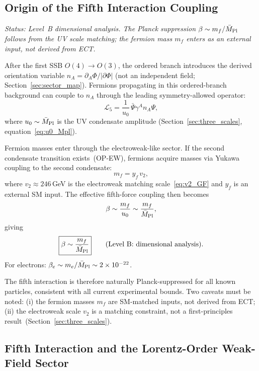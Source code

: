 \documentclass[11pt,a4paper]{article}
\numberwithin{equation}{section}
\begin{document}
\subsection{Origin of the Fifth Interaction Coupling}

\textit{Status: Level~B dimensional analysis. The Planck suppression
$\beta\sim m_f/\bar{M}_{\rm Pl}$ follows from the UV scale matching;
the fermion mass $m_f$ enters as an external input, not derived from ECT.}

After the first SSB $O(4)\to O(3)$, the ordered branch introduces
the derived orientation variable $n_A=\partial_A\Phi/|\partial\Phi|$
(not an independent field; Section~\ref{sec:sector_map}).
Fermions propagating in this ordered-branch background can couple
to $n_A$ through the leading symmetry-allowed operator:
\begin{equation}
  \mathcal{L}_5 = \frac{1}{u_0}\,\bar{\Psi}\gamma^A n_A \Psi,
\end{equation}
where $u_0\sim\bar{M}_{\rm Pl}$ is the UV condensate amplitude
(Section~\ref{sec:three_scales}, equation~\eqref{eq:u0_Mpl}).

Fermion masses enter through the electroweak-like sector.
If the second condensate transition exists~(OP-EW), fermions
acquire masses via Yukawa coupling to the second condensate:
\begin{equation}
  m_f = y_f\,v_2,
\end{equation}
where $v_2\approx246$\,GeV is the electroweak matching
scale~\eqref{eq:v2_GF} and $y_f$ is an external SM input.
The effective fifth-force coupling then becomes
\begin{equation}
  \beta \sim \frac{m_f}{u_0} \sim \frac{m_f}{\bar{M}_{\rm Pl}},
  \label{eq:fifth_coupling}
\end{equation}
giving
\begin{equation}
  \boxed{\beta \sim \frac{m_f}{\bar{M}_{\rm Pl}}}
  \qquad\text{(Level~B: dimensional analysis).}
\end{equation}
For electrons: $\beta_e\sim m_e/\bar{M}_{\rm Pl}\sim2\times10^{-22}$.

The fifth interaction is therefore naturally Planck-suppressed for
all known particles, consistent with all current experimental bounds.
Two caveats must be noted: (i) the fermion masses $m_f$ are
SM-matched inputs, not derived from ECT; (ii) the electroweak
scale $v_2$ is a matching constraint, not a first-principles
result~(Section~\ref{sec:three_scales}).

\subsection{Fifth Interaction and the Lorentz-Order Weak-Field Sector}
\end{document}
